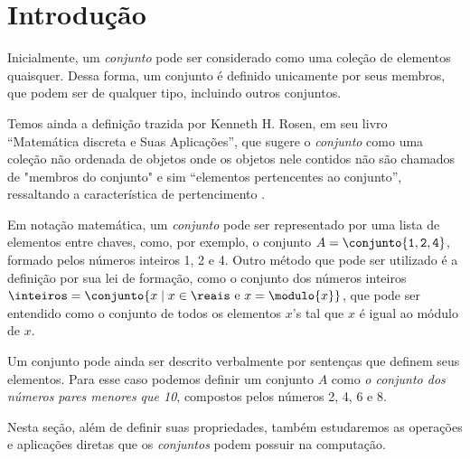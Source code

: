 \section{Introdução}

Inicialmente, um \emph{conjunto} pode ser considerado como uma coleção de elementos quaisquer. Dessa forma, um conjunto é definido unicamente por seus membros, que podem ser de qualquer tipo, incluindo outros conjuntos. 

Temos ainda a definição trazida por Kenneth H. Rosen, em seu livro “Matemática discreta e Suas Aplicações”, que sugere o \emph{conjunto} como uma coleção não ordenada de objetos onde os objetos nele contidos não são chamados de "membros do conjunto" e sim “elementos pertencentes ao conjunto”, ressaltando a característica de pertencimento \cite[pp. 111--112]{kenneth2010}.

Em notação matemática, um \emph{conjunto} pode ser representado por uma lista de elementos entre chaves, como, por exemplo, o conjunto $A = \conjunto {\texttt 1, \texttt 2, \texttt 4}$, formado pelos números inteiros 1, 2 e 4. Outro método que pode ser utilizado é a definição por sua lei de formação, como o conjunto dos números inteiros $\inteiros = \conjunto {x \mid x \in \reais \text{ e } x = \modulo{x} }$, que pode ser entendido como o conjunto de todos os elementos $x$'s tal que $x$ é igual ao módulo de $x$.

Um conjunto pode ainda ser descrito verbalmente por sentenças que definem seus elementos. Para esse caso podemos definir um conjunto $A$ como \emph{o conjunto dos números pares menores que 10}, compostos pelos números 2, 4, 6 e 8. 

Nesta seção, além de definir suas propriedades, também estudaremos as operações e aplicações diretas que os \emph{conjuntos} podem possuir na computação.